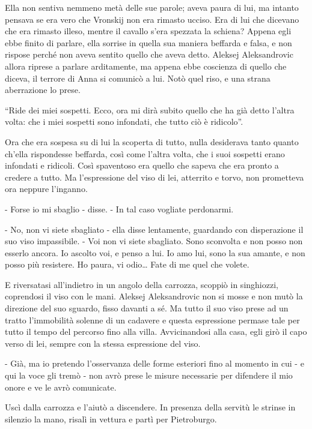 Ella non sentiva nemmeno metà delle sue parole; aveva paura di lui, ma intanto pensava se era vero che Vronskij non era rimasto ucciso. Era di lui che dicevano che era rimasto illeso, mentre il cavallo s'era spezzata la schiena? Appena egli ebbe finito di parlare, ella sorrise in quella sua maniera beffarda e falsa, e non rispose perché non aveva sentito quello che aveva detto. Aleksej Aleksandrovic allora riprese a parlare arditamente, ma appena ebbe coscienza di quello che diceva, il terrore di Anna si comunicò a lui. Notò quel riso, e una strana aberrazione lo prese. 

``Ride dei miei sospetti. Ecco, ora mi dirà subito quello che ha già detto l'altra volta: che i miei sospetti sono infondati, che tutto ciò è ridicolo''. 

Ora che era sospesa su di lui la scoperta di tutto, nulla desiderava tanto quanto ch'ella rispondesse beffarda, così come l'altra volta, che i suoi sospetti erano infondati e ridicoli. Così spaventoso era quello che sapeva che era pronto a credere a tutto. Ma l'espressione del viso di lei, atterrito e torvo, non prometteva ora neppure l'inganno. 

- Forse io mi sbaglio - disse. - In tal caso vogliate perdonarmi. 

- No, non vi siete sbagliato - ella disse lentamente, guardando con disperazione il suo viso impassibile. - Voi non vi siete sbagliato. Sono sconvolta e non posso non esserlo ancora. Io ascolto voi, e penso a lui. Io amo lui, sono la sua amante, e non posso più resistere. Ho paura, vi odio\ldots{} Fate di me quel che volete. 

E riversatasi all'indietro in un angolo della carrozza, scoppiò in singhiozzi, coprendosi il viso con le mani. Aleksej Aleksandrovic non si mosse e non mutò la direzione del suo sguardo, fisso davanti a sé. Ma tutto il suo viso prese ad un tratto l'immobilità solenne di un cadavere e questa espressione permase tale per tutto il tempo del percorso fino alla villa. Avvicinandosi alla casa, egli girò il capo verso di lei, sempre con la stessa espressione del viso. 

- Già, ma io pretendo l'osservanza delle forme esteriori fino al momento in cui - e qui la voce gli tremò - non avrò prese le misure necessarie per difendere il mio onore e ve le avrò comunicate. 

Uscì dalla carrozza e l'aiutò a discendere. In presenza della servitù le strinse in silenzio la mano, risalì in vettura e partì per Pietroburgo. 


